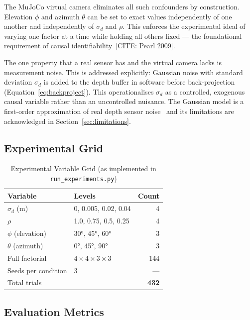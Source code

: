\documentclass[journal]{IEEEtran}
\begin{document}
The MuJoCo virtual camera eliminates all such confounders by construction.
Elevation $\phi$ and azimuth $\theta$ can be set to exact values
independently of one another and independently of $\sigma_d$ and $\rho$.
This enforces the experimental ideal of varying one factor at a time while
holding all others fixed --- the foundational requirement of causal
identifiability~[CITE: Pearl 2009].

The one property that a real sensor has and the virtual camera lacks is
measurement noise.  This is addressed explicitly: Gaussian noise with
standard deviation $\sigma_d$ is added to the depth buffer in software
before back-projection (Equation~\ref{eq:backproject}).  This operationalises
$\sigma_d$ as a controlled, exogenous causal variable rather than an
uncontrolled nuisance.  The Gaussian model is a first-order approximation of
real depth sensor noise~\cite{khoshelham2012accuracy, nguyen2012kinect} and
its limitations are acknowledged in Section~\ref{sec:limitations}.

\subsection{Experimental Grid}

\begin{table}[t]
  \caption{Experimental Variable Grid (as implemented in
           \texttt{run\_experiments.py})}
  \label{tab:grid}
  \centering
  \begin{tabular}{llr}
    \toprule
    \textbf{Variable} & \textbf{Levels} & \textbf{Count} \\
    \midrule
    $\sigma_d$ (m)      & 0, 0.005, 0.02, 0.04 & 4 \\
    $\rho$              & 1.0, 0.75, 0.5, 0.25 & 4 \\
    $\phi$ (elevation)  & 30°, 45°, 60°         & 3 \\
    $\theta$ (azimuth)  & 0°, 45°, 90°          & 3 \\
    \midrule
    Full factorial      & $4{\times}4{\times}3{\times}3$ & 144 \\
    Seeds per condition & 3 & --- \\
    Total trials        & & \textbf{432} \\
    \bottomrule
  \end{tabular}
\end{table}

\subsection{Evaluation Metrics}
\end{document}
